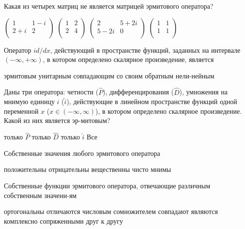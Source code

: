 \documentclass[11pt,a4paper]{exam}
\begin{document}
\begin{questions}
\question Какая из четырех матриц не является матрицей эрмитового оператора?
\begin{choices}
\choice $\left( \begin{matrix}
   1 & 1-i  \\
   2+i & 2  \\
\end{matrix} \right)$      
\choice $\left( \begin{matrix}
   1 & 2  \\
   2 & 4  \\
\end{matrix} \right)$      
\choice $\left( \begin{matrix}
   2 & 5+2i  \\
   5-2i & 0  \\
\end{matrix} \right)$      
\choice $\left( \begin{matrix}
   1 & 1  \\
   1 & 1  \\
\end{matrix} \right)$
\end{choices}

\question Оператор $id/dx$, действующий в пространстве функций, заданных на интервале $(-\infty ,+\infty )$, в котором определено скалярное произведение, является
\begin{choices}
\choice эрмитовым 
\choice унитарным    
\choice совпадающим со своим обратным  
\choice нели-нейным
\end{choices}

\question Даны три оператора: четности ($\hat{P}$), дифференцирования ($\hat{D}$), умножения на мнимую единицу $i$ ($\hat{i}$), действующие в линейном пространстве функций одной переменной $x$ ($x\in (-\infty ,\infty )$), в котором определено скалярное произведение. Какой из них является эр-митовым?
\begin{choices}
\choice только $\hat{P}$      
\choice только $\hat{D}$      
\choice только $\hat{i}$      
\choice Все 
\end{choices}

\question Собственные значения любого эрмитового оператора 
\begin{choices}
\choice положительны    
\choice отрицательны       
\choice вещественны     
\choice чисто мнимы
\end{choices}

\question Собственные функции эрмитового оператора, отвечающие различным собственным значени-ям 
\begin{choices}
\choice ортогональны             
\choice отличаются числовым сомножителем
\choice совпадают             
\choice являются комплексно сопряженными друг к другу
\end{choices}


\end{questions}
\end{document}
